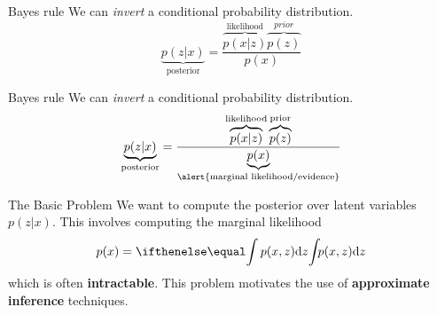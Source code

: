 \documentclass[14pt]{beamer}
\begin{document}
\begin{frame}{Bayes rule}
We can \textit{invert} a conditional probability distribution.
\begin{equation*}
\underbrace{p(z|x)}_{\text{posterior}} = \frac{\overbrace{p(x|z)}^{\text{likelihood}}\overbrace{p(z)}^{prior}}{p(x)}
\end{equation*}
\end{frame}

\begin{frame}{Bayes rule}
We can \textit{invert} a conditional probability distribution.
\begin{equation*}
\underbrace{p(z|x)}_{\text{posterior}} = \frac{\overbrace{p(x|z)}^{\text{likelihood}}\overbrace{p(z)}^{\text{prior}}}{\underbrace{p(x)}_{\text{\alert{marginal likelihood/evidence}}}}
\end{equation*}
\end{frame}

\begin{frame}{The Basic Problem}
We want to compute the posterior over latent variables $ p(z|x) $. This involves computing the marginal likelihood
$$ p(x) = \intl{ p(x,z) }{z} $$
which is often \textbf{intractable}. This problem motivates the use of \textbf{approximate inference} techniques.
\end{frame}

%
\end{document}
